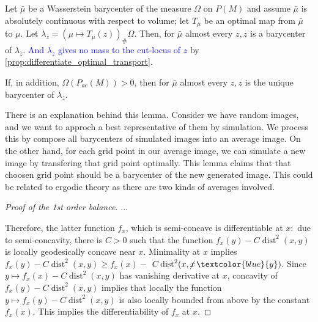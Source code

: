 \begin{lem} 
	\label{lem:inverse_barycenter}
	Let \( \bar { \mu } \) be a Wasserstein barycenter of the measure \( \Omega \) on \( P ( M ) \) and assume \( \bar { \mu } \) is absolutely continuous with respect to volume;
	let \( T _ { \mu } \) be an optimal map from \( \bar { \mu } \) to \( \mu . \)
	Let \( \lambda _ { z } = \left( \mu \mapsto T _ { \mu } ( z ) \right) _ { \# } \Omega . \)
	Then, for \( \bar { \mu } \) almost every \( z , z \) is a barycenter of \( \lambda _ { z }\).
	\textcolor{blue}{And $\lambda_z$ gives no mass to the cut-locus of $z$} by \cref{prop:differentiate_optimal_transport}.

	If, in addition, \( \Omega \left( P _ { a c } ( M ) \right) > 0 \), then for \( \bar { \mu } \) almost every \( z , z \) is the unique barycenter of $\lambda _ { z }$.

\end{lem}

There is an explanation behind this lemma. Consider we have random images, and we want to approch a best representative of them by simulation. We process this by compose all barycenters of simulated images into an average image. On the other hand, for each grid point in our average image, we can simulate a new image by transfering that grid point optimally. This lemma claims that that choosen grid point should be a barycenter of the new generated image. This could be related to ergodic theory as there are two kinds of averages involved.


\begin{proof}[Proof of the 1st order balance]
	...

	Therefore, the latter function \( f _ { x } \), which is semi-concave is differentiable at \( x : \) due to semi-concavity, there is \( C > 0 \) such that the function \( f _ { x } ( y ) - C \operatorname { dist } ^ { 2 } ( x , y ) \) is locally geodesically concave near \( x \).
	Minimality at \( x \) implies \( f _ { x } ( y ) - C \operatorname { dist } ^ { 2 } ( x , y ) \geq f _ { x } ( x ) - \) \( C \operatorname { dist } ^ { 2 } ( x , \cancel{x}\, \textcolor{blue}{y} ) \).
	Since \( y \mapsto f _ { x } ( x ) - C \operatorname { dist } ^ { 2 } ( x , y ) \) has vanishing derivative at \( x \), concavity of \( f _ { x } ( y ) - C \operatorname { dist } ^ { 2 } ( x , y ) \) implies that locally the function \( y \mapsto f _ { x } ( y ) - C \operatorname { dist } ^ { 2 } ( x , y ) \) is also
	locally bounded from above by the constant \( f _ { x } ( x ) . \) This implies the differentiability of
	\( f _ { x } \) at \( x \).
\end{proof}


